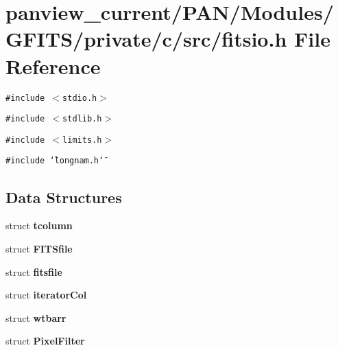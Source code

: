 \section{panview\_\-current/PAN/Modules/GFITS/private/c/src/fitsio.h File Reference}
\label{fitsio_8h}
{\tt \#include $<$stdio.h$>$}\par
{\tt \#include $<$stdlib.h$>$}\par
{\tt \#include $<$limits.h$>$}\par
{\tt \#include \char`\"{}longnam.h\char`\"{}}\par
\subsection*{Data Structures}
\begin{CompactItemize}
\item 
struct \bf{tcolumn}
\item 
struct \bf{FITSfile}
\item 
struct \bf{fitsfile}
\item 
struct \bf{iterator\-Col}
\item 
struct \bf{wtbarr}
\item 
struct \bf{Pixel\-Filter}
\end{CompactItemize}
